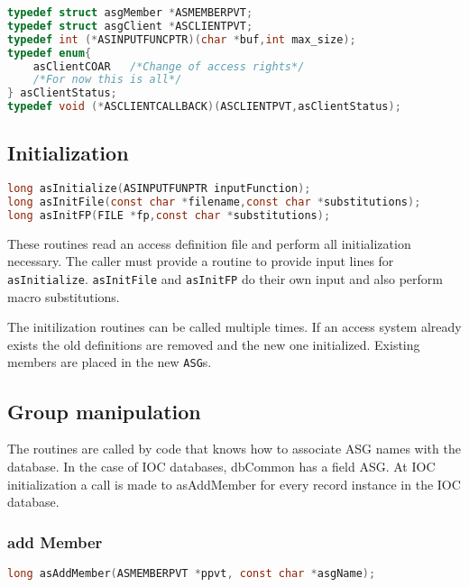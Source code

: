 \begin{lstlisting}[language=C]
typedef struct asgMember *ASMEMBERPVT;
typedef struct asgClient *ASCLIENTPVT;
typedef int (*ASINPUTFUNCPTR)(char *buf,int max_size);
typedef enum{
    asClientCOAR   /*Change of access rights*/
    /*For now this is all*/
} asClientStatus;
typedef void (*ASCLIENTCALLBACK)(ASCLIENTPVT,asClientStatus);
\end{lstlisting}

\subsection{Initialization}

\begin{lstlisting}[language=C]
long asInitialize(ASINPUTFUNPTR inputFunction);
long asInitFile(const char *filename,const char *substitutions);
long asInitFP(FILE *fp,const char *substitutions);
\end{lstlisting}

These routines read an access definition file and perform all initialization necessary. The caller must provide a routine to 
provide input lines for \verb|asInitialize|.
\verb|asInitFile| and \verb|asInitFP| do their own input and also perform macro 
substitutions.

The initilization routines can be called multiple times. If an access system already exists the old definitions are removed 
and the new one initialized. Existing members are placed in the new \verb|ASG|s. 

\subsection{Group manipulation}

The routines are called by code that knows how to associate ASG names with the database. In the case of IOC databases, 
dbCommon has a field ASG. At IOC initialization a call is made to asAddMember for every record instance in the IOC 
database.

\subsubsection{add Member}

\begin{lstlisting}[language=C]
long asAddMember(ASMEMBERPVT *ppvt, const char *asgName);
\end{lstlisting}

